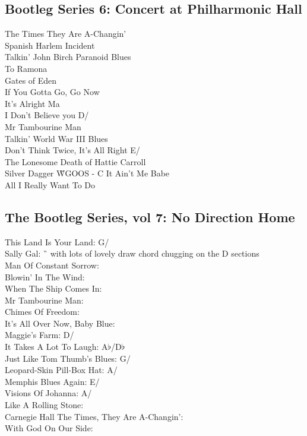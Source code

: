 \subsection{Bootleg Series 6: Concert at Philharmonic Hall}

The Times They Are A-Changin'  \G\\
Spanish Harlem Incident \G\\
Talkin' John Birch Paranoid Blues \G\\
To Ramona \D \\
Gates of Eden \G\\
If You Gotta Go, Go Now \G\\
It's Alright Ma \G\\
I Don't Believe you D/\G\\
Mr Tambourine Man \E \\
Talkin' World War III Blues \G\\
Don't Think Twice, It's All Right E/\A \\
The Lonesome Death of Hattie Carroll \E\\
Silver Dagger \G
WGOOS - C
It Ain't Me Babe \G\\
All I Really Want To Do \C


\subsection{The Bootleg Series, vol 7: No Direction Home}

This Land Is Your Land: G/\C \\
Sally Gal: \G\ {} with lots of lovely draw chord chugging on the D sections \\
Man Of Constant Sorrow: \G\\
Blowin' In The Wind: \D \\
When The Ship Comes In: \G\\
Mr Tambourine Man: \E \\
Chimes Of Freedom: \G\\
It's All Over Now, Baby Blue: \D \\
Maggie's Farm: D/\G\\
It Takes A Lot To Laugh: A$\flat$/D$\flat$ \\
Just Like Tom Thumb's Blues: G/\C \\
Leopard-Skin Pill-Box Hat: A/\D \\
Memphis Blues Again: E/\A \\
Visions Of Johanna: A/\D \\
Like A Rolling Stone: \C \\
Carnegie Hall The Times, They Are A-Changin': \G\\
With God On Our Side: \C

